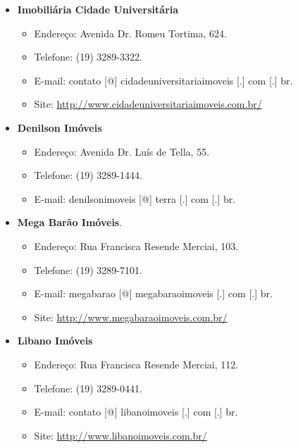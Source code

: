 \begin{itemize}
\item  \textbf{Imobiliária Cidade Universitária}
\begin{itemize}
\item  Endereço: Avenida Dr. Romeu Tortima, 624.
\item  Telefone: (19) 3289-3322.
\item  E-mail: contato [@] cidadeuniversitariaimoveis [.] com [.] br.
\item  Site: \url{http://www.cidadeuniversitariaimoveis.com.br/}
\end{itemize}
\end{itemize}

\begin{itemize}
\item  \textbf{Denilson Imóveis}
\begin{itemize}
\item  Endereço: Avenida Dr. Luís de Tella, 55.
\item  Telefone: (19) 3289-1444.
\item  E-mail: denilsonimoveis [@] terra [.] com [.] br.
\end{itemize}
\end{itemize}

\begin{itemize}
\item  \textbf{Mega Barão Imóveis}.
\begin{itemize}
\item  Endereço: Rua Francisca Resende Merciai, 103.
\item  Telefone: (19) 3289-7101.
\item  E-mail: megabarao [@] megabaraoimoveis [.] com [.] br.
\item  Site: \url{http://www.megabaraoimoveis.com.br/}
\end{itemize}
\end{itemize}

\begin{itemize}
\item  \textbf{Libano Imóveis}
\begin{itemize}
\item  Endereço: Rua Francisca Resende Merciai, 112.
\item  Telefone: (19) 3289-0441.
\item  E-mail: contato [@] libanoimoveis [.] com [.] br.
\item  Site: \url{http://www.libanoimoveis.com.br/}
\end{itemize}
\end{itemize}

